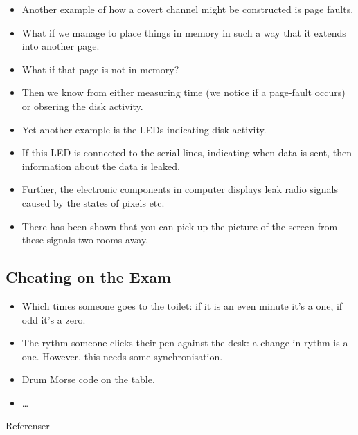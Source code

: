 \documentclass{beamer}
\begin{document}
\begin{frame}
  \begin{itemize}
    \item Another example of how a covert channel might be constructed is page 
      faults.

    \item What if we manage to place things in memory in such a way that it 
      extends into another page.

    \item What if that page is not in memory?

    \item Then we know from either measuring time (we notice if a page-fault 
      occurs) or obsering the disk activity.
  \end{itemize}
\end{frame}

\begin{frame}
  \begin{itemize}
    \item Yet another example is the LEDs indicating disk activity.

    \item If this LED is connected to the serial lines, indicating when data is 
      sent, then information about the data is leaked.

    \item Further, the electronic components in computer displays leak radio 
      signals caused by the states of pixels etc.

    \item There has been shown that you can pick up the picture of the screen 
      from these signals two rooms away.

  \end{itemize}
\end{frame}

\subsection{Cheating on the Exam}

\begin{frame}
  \begin{itemize}
    \item Which times someone goes to the toilet: if it is an even minute it's 
      a one, if odd it's a zero.

    \item The rythm someone clicks their pen against the desk: a change in 
      rythm is a one.
      However, this needs some synchronisation.

    \item Drum Morse code on the table.

    \item \dots

  \end{itemize}
\end{frame}



\begin{frame}{Referenser}
  \small
  \printbibliography{}
\end{frame}
\end{document}
